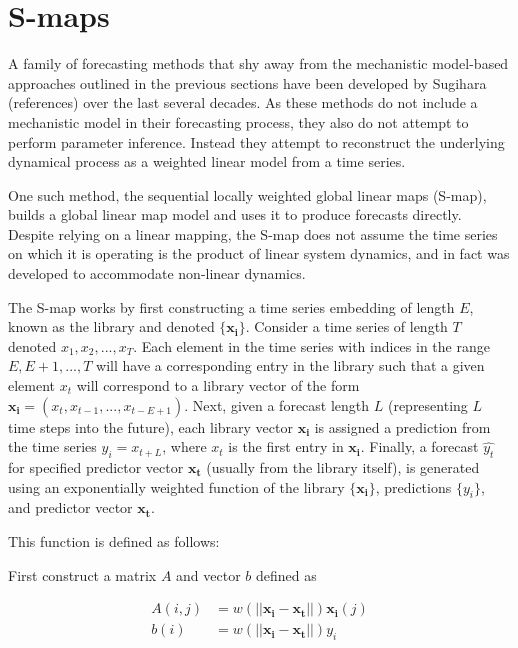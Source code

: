 
\section{S-maps}

    A family of forecasting methods that shy away from the mechanistic model-based approaches outlined in the previous sections have been developed by Sugihara (references) over the last several decades. As these methods do not include a mechanistic model in their forecasting process, they also do not attempt to perform parameter inference. Instead they attempt to reconstruct the underlying dynamical process as a weighted linear model from a time series.

    One such method, the sequential locally weighted global linear maps (S-map), builds a global linear map model and uses it to produce forecasts directly. Despite relying on a linear mapping, the S-map does not assume the time series on which it is operating is the product of linear system dynamics, and in fact was developed to accommodate non-linear dynamics.

    The S-map works by first constructing a time series embedding of length $E$, known as the library and denoted $\{\mathbf{x_i}\}$. Consider a time series of length $T$ denoted $x_1, x_2,..., x_T$. Each element in the time series with indices in the range $E,E+1,...,T$ will have a corresponding entry in the library such that a given element $x_t$ will correspond to a library vector of the form $\mathbf{x_i} = (x_t, x_{t-1},...,x_{t-E+1})$. Next, given a forecast length $L$ (representing $L$ time steps into the future), each library vector $\mathbf{x_i}$ is assigned a prediction from the time series $y_i = x_{t+L}$, where $x_t$ is the first entry in $\mathbf{x_i}$. Finally, a forecast ${\hat{y_t}}$ for specified predictor vector $\mathbf{x_t}$ (usually from the library itself), is generated using an exponentially weighted function of the library $\{\mathbf{x_i}\}$, predictions $\{y_i\}$, and predictor vector $\mathbf{x_t}$.

    This function is defined as follows:

    First construct a matrix $A$ and vector $b$ defined as

    \begin{equation}\label{AB}
    	\begin{array}{rl}
        \displaystyle
            A(i, j) & = w (||\mathbf{x_i}-\mathbf{x_t}||) \mathbf{x_i}(j) \\
            b(i) 	& = w (||\mathbf{x_i}-\mathbf{x_t}||) y_i
        \end{array}
    \end{equation}

